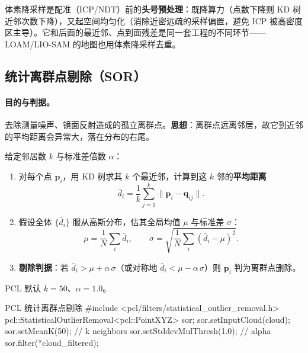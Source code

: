 \begin{insight}
体素降采样是配准（ICP/NDT）前的\textbf{头号预处理}：既降算力（点数下降则 KD 树近邻次数下降），又起空间均匀化（消除近密远疏的采样偏置，避免 ICP 被高密度区主导）。它和后面的最近邻、点到面残差是同一套工程的不同环节——LOAM/LIO-SAM 的地图也用体素降采样去重。
\end{insight}

\subsection{统计离群点剔除（SOR）}
\label{sec:pc-sor}

\paragraph{目的与判据。}
去除测量噪声、镜面反射造成的孤立离群点。\textbf{思想}：离群点远离邻居，故它到近邻的平均距离会异常大，落在分布的右尾。

\begin{algo}\label{alg:pc-sor}
给定邻居数 $k$ 与标准差倍数 $\alpha$：
\begin{enumerate}
  \item 对每个点 $\mathbf{p}_i$，用 KD 树求其 $k$ 个最近邻，计算到这 $k$ 邻的\textbf{平均距离}
  \begin{equation}
    \bar{d}_i=\frac{1}{k}\sum_{j=1}^{k}\|\mathbf{p}_i-\mathbf{q}_{ij}\|.
    \label{eq:pc-sor-dbar}
  \end{equation}
  \item 假设全体 $\{\bar{d}_i\}$ 服从高斯分布，估其全局均值 $\mu$ 与标准差 $\sigma$：
  \begin{equation}
    \mu=\frac{1}{N}\sum_i\bar{d}_i,\qquad
    \sigma=\sqrt{\frac{1}{N}\sum_i(\bar{d}_i-\mu)^2}.
    \label{eq:pc-sor-musigma}
  \end{equation}
  \item \textbf{剔除判据}：若 $\bar{d}_i>\mu+\alpha\,\sigma$（或对称地 $\bar{d}_i<\mu-\alpha\,\sigma$）则 $\mathbf{p}_i$ 判为离群点删除。
\end{enumerate}
\end{algo}

\noindent PCL 默认 $k=50$、$\alpha=1.0$\cite{rusu2011pcl}。

\begin{codebox}[C++]{PCL 统计离群点剔除}
#include <pcl/filters/statistical_outlier_removal.h>
pcl::StatisticalOutlierRemoval<pcl::PointXYZ> sor;
sor.setInputCloud(cloud);
sor.setMeanK(50);                 // k neighbors
sor.setStddevMulThresh(1.0);      // alpha
sor.filter(*cloud_filtered);
\end{codebox}

